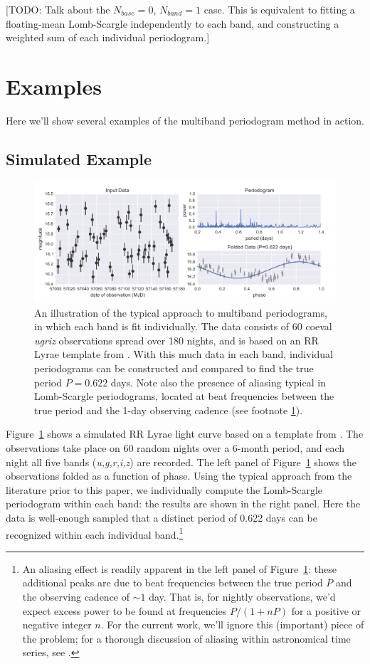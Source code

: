 \documentclass[12pt,preprint]{aastex}
\newcommand{\todo}[1]{{\color{red} [TODO: #1]}}
\newcommand{\Fig}[1]{Figure~\ref{fig:#1}}
\newcommand{\fig}[1]{\Fig{#1}}
\newcommand{\figlabel}[1]{\label{fig:#1}}
\newcommand{\sectlabel}[1]{\label{sect:#1}}
\begin{document}
\todo{Talk about the $N_{base} = 0$, $N_{band} = 1$ case. This is equivalent to fitting a floating-mean Lomb-Scargle independently to each band, and constructing a weighted sum of each individual periodogram.}

\section{Examples}
Here we'll show several examples of the multiband periodogram method in action.

\subsection{Simulated Example}
\sectlabel{Simulated}

\begin{figure}
  \centering
  \includegraphics[width=\textwidth]{fig01.pdf}
  \caption{
    An illustration of the typical approach to multiband periodograms,
    in which each band is fit individually. The data consists of 60 coeval
    {\it ugriz} observations spread over 180 nights, and is based on an
    RR Lyrae template from \citet{Sesar2010}. With this much data in each
    band, individual periodograms can be constructed and compared to find the
    true period $P=0.622$ days. Note also the presence of aliasing typical
    in Lomb-Scargle periodograms, located at beat frequencies between the
    true period and the 1-day observing cadence (see footnote \ref{foot1}).
  }
  \figlabel{adhoc_example}
\end{figure}

\fig{adhoc_example} shows a simulated RR Lyrae light curve based on a template from \citet{Sesar2010}. The observations take place on 60 random nights over a 6-month period, and each night all five bands ({\it u,g,r,i,z}) are recorded. The left panel of \fig{adhoc_example} shows the observations folded as a function of phase.
Using the typical approach from the literature prior to this paper, we individually compute the Lomb-Scargle periodogram within each band: the results are shown in the right panel. Here the data is well-enough sampled that a distinct period of 0.622 days can be recognized within each individual band.\footnote{\label{foot1}
  An aliasing effect is readily apparent in the left panel of \fig{adhoc_example}: these additional peaks are due to beat frequencies between the true period $P$ and the observing cadence of $\sim 1$ day. That is, for nightly observations, we'd expect excess power to be found at frequencies $P / (1 + nP)$ for a positive or negative integer $n$. For the current work, we'll ignore this (important) piece of the problem; for a thorough discussion of aliasing within astronomical time series, see \citet{Roberts87}.}
\end{document}
